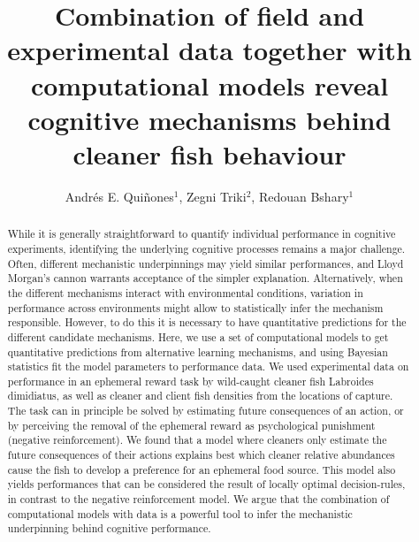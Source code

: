 \documentclass[]{rsos}%
\begin{document}
\title{Combination of field and experimental data together with computational models reveal cognitive mechanisms behind cleaner fish behaviour}

\author{
Andrés E. Quiñones$^{1}$,
Zegni Triki$^{2}$,
Redouan Bshary$^{1}$}

\address{
  $^{1}$Institute of Biology, University of Neuchâtel, Neuchâtel, Switzerland\\
  $^{2}$Department of Zoology, Stockholm University, Stockholm, Sweden}
\subject{
Behavioural ecology,
Cognitive ecology,
Animal behaviour}



\begin{abstract}
While it is generally straightforward to quantify individual performance in cognitive experiments, identifying the underlying cognitive processes remains a major challenge. Often, different mechanistic underpinnings may yield similar performances, and Lloyd Morgan's cannon warrants acceptance of the simpler explanation. Alternatively, when the different mechanisms interact with environmental conditions, variation in performance across environments might allow to statistically infer the mechanism responsible. However, to do this it is necessary to have quantitative predictions for the different candidate mechanisms. Here, we use a set of computational models to get quantitative predictions from alternative learning mechanisms, and using Bayesian statistics fit the model parameters to performance data. We used experimental data on performance in an ephemeral reward task by wild-caught cleaner fish Labroides dimidiatus, as well as cleaner and client fish densities from the locations of capture. The task can in principle be solved by estimating future consequences of an action, or by perceiving the removal of the ephemeral reward as psychological punishment (negative reinforcement). We found that a model where cleaners only estimate the future consequences of their actions explains best which cleaner relative abundances cause the fish to develop a preference for an ephemeral food source. This model also yields performances that can be considered the result of locally optimal decision-rules, in contrast to the negative reinforcement model. We argue that the combination of computational models with data is a powerful tool to infer the mechanistic underpinning behind cognitive performance.
\end{abstract}
\end{document}
